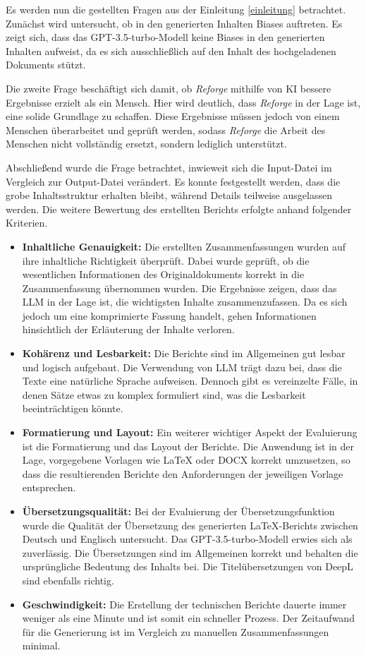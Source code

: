 Es werden nun die gestellten Fragen aus der Einleitung \ref{einleitung} betrachtet. Zunächst wird untersucht, ob in den generierten Inhalten Biases auftreten. Es zeigt sich, dass das \ac{GPT}-3.5-turbo-Modell keine Biases in den generierten Inhalten aufweist, da es sich ausschließlich auf den Inhalt des hochgeladenen Dokuments stützt.

Die zweite Frage beschäftigt sich damit, ob \textit{Reforge} mithilfe von \ac{KI} bessere Ergebnisse erzielt als ein Mensch. Hier wird deutlich, dass \textit{Reforge} in der Lage ist, eine solide Grundlage zu schaffen. Diese Ergebnisse müssen jedoch von einem Menschen überarbeitet und geprüft werden, sodass \textit{Reforge} die Arbeit des Menschen nicht vollständig ersetzt, sondern lediglich unterstützt.

Abschließend wurde die Frage betrachtet, inwieweit sich die Input-Datei im Vergleich zur Output-Datei verändert. Es konnte festgestellt werden, dass die grobe Inhaltsstruktur erhalten bleibt, während Details teilweise ausgelassen werden. Die weitere Bewertung des erstellten Berichts erfolgte anhand folgender Kriterien.

\begin{itemize}
    \item \textbf{Inhaltliche Genauigkeit:} Die erstellten Zusammenfassungen wurden auf ihre inhaltliche Richtigkeit überprüft. Dabei wurde geprüft, ob die wesentlichen Informationen des Originaldokuments korrekt in die Zusammenfassung übernommen wurden. Die Ergebnisse zeigen, dass das \ac{LLM} in der Lage ist, die wichtigsten Inhalte zusammenzufassen. Da es sich jedoch um eine komprimierte Fassung handelt, gehen Informationen hinsichtlich der Erläuterung der Inhalte verloren.
    \item \textbf{Kohärenz und Lesbarkeit:} Die Berichte sind im Allgemeinen gut lesbar und logisch aufgebaut. Die Verwendung von \ac{LLM} trägt dazu bei, dass die Texte eine natürliche Sprache aufweisen. Dennoch gibt es vereinzelte Fälle, in denen Sätze etwas zu komplex formuliert sind, was die Lesbarkeit beeinträchtigen könnte.
    \item \textbf{Formatierung und Layout:} Ein weiterer wichtiger Aspekt der Evaluierung ist die Formatierung und das Layout der Berichte. Die Anwendung ist in der Lage, vorgegebene Vorlagen wie LaTeX oder \ac{DOCX} korrekt umzusetzen, so dass die resultierenden Berichte den Anforderungen der jeweiligen Vorlage entsprechen.
    \item \textbf{Übersetzungsqualität:} Bei der Evaluierung der Übersetzungsfunktion wurde die Qualität der Übersetzung des generierten LaTeX-Berichts zwischen Deutsch und Englisch untersucht. Das \ac{GPT}-3.5-turbo-Modell erwies sich als zuverlässig. Die Übersetzungen sind im Allgemeinen korrekt und behalten die ursprüngliche Bedeutung des Inhalts bei. Die Titelübersetzungen von DeepL sind ebenfalls richtig.
    \item \textbf{Geschwindigkeit:} Die Erstellung der technischen Berichte dauerte immer weniger als eine Minute und ist somit ein schneller Prozess. Der Zeitaufwand für die Generierung ist im Vergleich zu manuellen Zusammenfassungen minimal.
\end{itemize}

